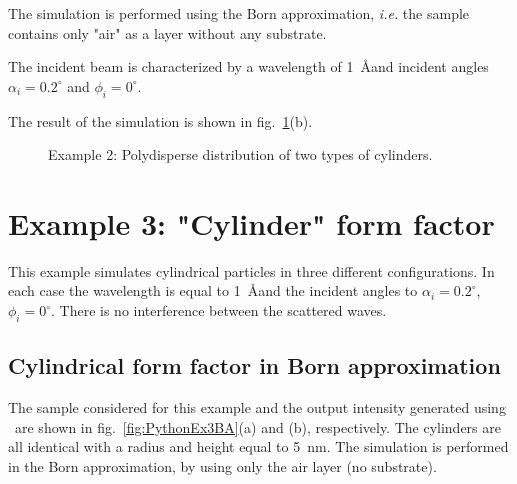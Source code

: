 The simulation is performed using the Born approximation, \textit{i.e.} the sample contains only "air" as a layer without any substrate.

The incident beam is characterized by a wavelength of 1~\AA and incident angles
$\alpha_i=0.2^{\circ}$ and $\phi_i=0^{\circ}$.

The result of the simulation is shown in fig.~\ref{fig:PythonEx2}(b). 

\begin{figure}[H]
\hfill
{}
\hfill
{}
\hfill
\caption{Example 2: Polydisperse distribution of two types of cylinders.}
\label{fig:PythonEx2}
\end{figure}

\newpage
\section{Example 3: "Cylinder" form factor}
This example simulates cylindrical particles in three different configurations.
In each case the wavelength is equal to 1~\AA and the incident angles to $\alpha_i=0.2^{\circ}$, $\phi_i=0^{\circ}$. There is no interference between the scattered waves.

\subsection{Cylindrical form factor in Born approximation} \label{sec:ex003CylinderBA}
The sample considered for this example and the output intensity generated using \BornAgain\ are shown in fig.~\ref{fig:PythonEx3BA}(a) and (b), respectively. The cylinders are all identical with a radius and height equal to 5~nm. The simulation is performed in the Born approximation, by using only the air layer (no substrate).

